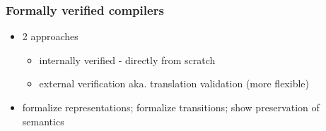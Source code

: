 \documentclass[aspectratio=169]{beamer}
\begin{document}
\begin{frame}
	\frametitle{Formally verified compilers}
	\begin{itemize}
		\item 2 approaches
		\begin{itemize}
			\item internally verified - directly from scratch
			\item external verification aka. translation validation (more flexible)
		\end{itemize}
		
	\begin{center}
	\end{center}
	
	
		\item formalize representations; formalize transitions; show preservation of \color{cyan} semantics
	\end{itemize}
\end{frame}
\end{document}
